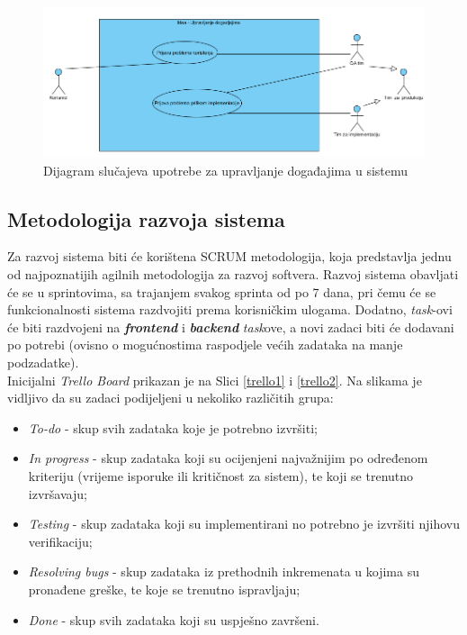 \documentclass[12pt,a4paper]{article}
\begin{document}
\begin{figure}[H]
\center
\includegraphics[scale=0.45]{../res/UseCase/useCase2.PNG}
\caption{Dijagram slučajeva upotrebe za upravljanje događajima u sistemu}
\label{useCase2}
\end{figure}

\newpage

\subsection{Metodologija razvoja sistema}

\quad Za razvoj sistema biti će korištena SCRUM metodologija, koja predstavlja jednu od najpoznatijih agilnih metodologija za razvoj softvera. Razvoj sistema obavljati će se u sprintovima, sa trajanjem svakog sprinta od po 7 dana, pri čemu će se funkcionalnosti sistema razdvojiti prema korisničkim ulogama. Dodatno, \textit{task}-ovi će biti razdvojeni na \textbf{\textit{frontend}} i \textbf{\textit{backend}} \textit{task}ove, a novi zadaci biti će dodavani po potrebi (ovisno o mogućnostima raspodjele većih zadataka na manje podzadatke). \\

Inicijalni \textit{Trello Board} prikazan je na Slici \ref{trello1} i \ref{trello2}. Na slikama je vidljivo da su zadaci podijeljeni u nekoliko različitih grupa:

\begin{itemize}
\renewcommand\labelitemi{-}
\item \textit{To-do} - skup svih zadataka koje je potrebno izvršiti;
\item \textit{In progress} - skup zadataka koji su ocijenjeni najvažnijim po određenom kriteriju (vrijeme isporuke ili kritičnost za sistem), te koji se trenutno izvršavaju;
\item \textit{Testing} - skup zadataka koji su implementirani no potrebno je izvršiti njihovu verifikaciju;
\item \textit{Resolving bugs} - skup zadataka iz prethodnih inkremenata u kojima su pronađene greške, te koje se trenutno ispravljaju;
\item \textit{Done} - skup svih zadataka koji su uspješno završeni.
\end{itemize}
\end{document}
